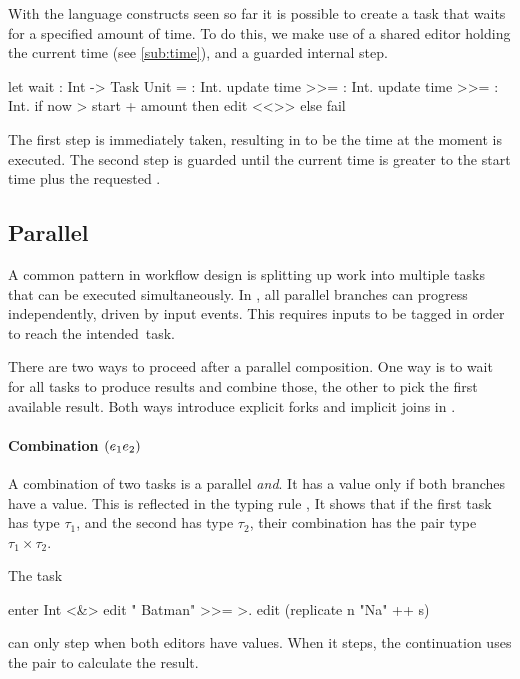 \begin{example}[Waiting]\label{exm:wait}

With the language constructs seen so far it is possible to create a task that waits for a specified amount of time.
To do this,
we make use of a shared editor holding the current time (see \cref{sub:time}),
and a guarded internal step.
\begin{TASK}
  let wait : Int -> Task Unit = \amount : Int.
    update time >>= \start : Int.
    update time >>= \now : Int.
      if now > start + amount then edit <<>> else fail
\end{TASK}
The first step is immediately taken, resulting in  to be the time at the moment  is executed.
The second step is guarded until the current time is greater to the start time plus the requested .

\end{example}



\subsection{Parallel}

A common pattern in workflow design is splitting up work into multiple tasks that can be executed simultaneously.
In \TOPHAT, all parallel branches can progress independently, driven by input events.
This requires inputs to be tagged in order to reach the intended~task. %

There are two ways to proceed after a parallel composition.
One way is to wait for all tasks to produce results and combine those,
the other to pick the first available result.
Both ways introduce explicit forks and implicit joins in \TOPHAT.


\paragraph{Combination $(e_1 \relax e_2)$}

A combination of two tasks is a parallel \emph{and}.
It has a value only if both branches have a value.
This is reflected in the typing rule ,
It shows that if the first task has type $\tau_1$,
and the second has type $\tau_2$,
their combination has the pair type $\tau_1 \times \tau_2$.



\begin{example}[Combining]

The task
\begin{TASK}
  enter Int <&> edit " Batman" >>= >. edit (replicate n "Na" ++ s)
\end{TASK}
can only step when both editors have values.
When it steps, the continuation uses the pair to calculate the result.

\end{example}


